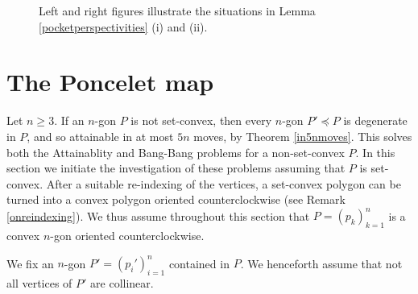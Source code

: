 \documentclass[11pt]{amsart}
\theoremstyle{remark}
\numberwithin{equation}{section}
\renewcommand{\precsim}{\preccurlyeq}
\renewcommand{\geq}{\geqslant}
\begin{document}
\begin{figure}[h]

\caption{Left and right figures illustrate the situations in Lemma \ref{pocketperspectivities} (i) and (ii).}
\label{fig_perspectivities}
\end{figure}



\section{The Poncelet map}
Let $n\geq 3$. If an $n$-gon $P$ is not set-convex, then every $n$-gon $P'\precsim P$ is degenerate in $P$, and so attainable in at most $5n$ moves, by Theorem \ref{in5nmoves}.
This solves both the Attainablity and Bang-Bang problems for a non-set-convex $P$.  In this section we initiate the investigation of these problems assuming that $P$ is set-convex. After a suitable re-indexing of the vertices, a set-convex polygon can be turned into a convex polygon oriented counterclockwise (see Remark \ref{onreindexing}). We thus assume throughout this section that  $P=(p_k)_{k=1}^n$ is a convex $n$-gon oriented counterclockwise.

We fix an $n$-gon $P'=(p_i')_{i=1}^n$ contained in $P$. We henceforth assume that not all vertices of $P'$ are collinear. %
\end{document}
